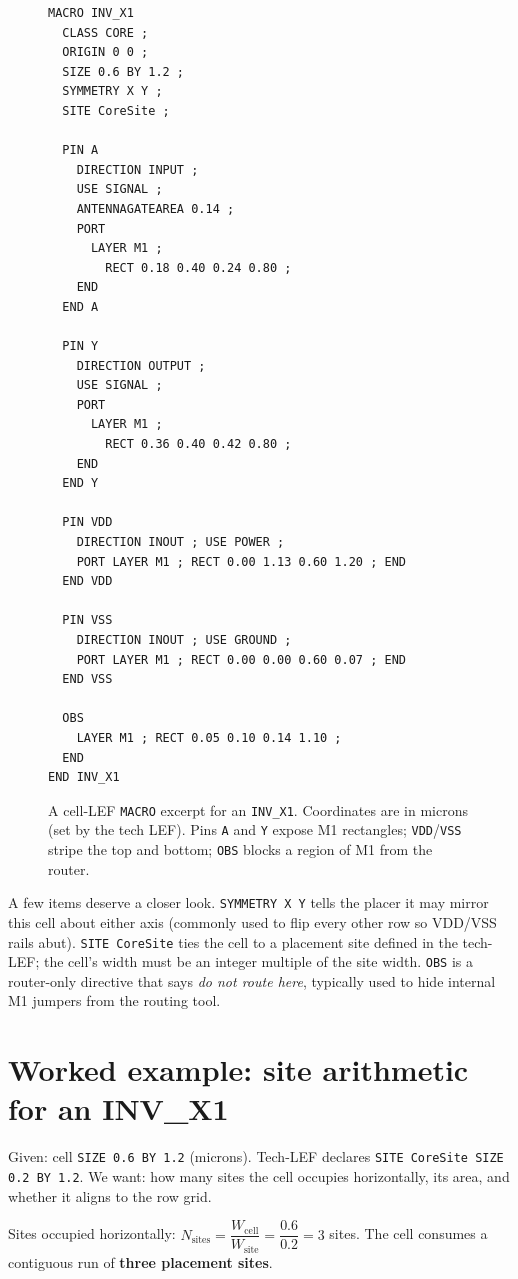 \begin{figure}[h]
\centering
\begin{lstlisting}[style=eda, basicstyle=\ttfamily\footnotesize, frame=single]
MACRO INV_X1
  CLASS CORE ;
  ORIGIN 0 0 ;
  SIZE 0.6 BY 1.2 ;
  SYMMETRY X Y ;
  SITE CoreSite ;

  PIN A
    DIRECTION INPUT ;
    USE SIGNAL ;
    ANTENNAGATEAREA 0.14 ;
    PORT
      LAYER M1 ;
        RECT 0.18 0.40 0.24 0.80 ;
    END
  END A

  PIN Y
    DIRECTION OUTPUT ;
    USE SIGNAL ;
    PORT
      LAYER M1 ;
        RECT 0.36 0.40 0.42 0.80 ;
    END
  END Y

  PIN VDD
    DIRECTION INOUT ; USE POWER ;
    PORT LAYER M1 ; RECT 0.00 1.13 0.60 1.20 ; END
  END VDD

  PIN VSS
    DIRECTION INOUT ; USE GROUND ;
    PORT LAYER M1 ; RECT 0.00 0.00 0.60 0.07 ; END
  END VSS

  OBS
    LAYER M1 ; RECT 0.05 0.10 0.14 1.10 ;
  END
END INV_X1
\end{lstlisting}
\caption{A cell-LEF \texttt{MACRO} excerpt for an \texttt{INV\_X1}. Coordinates are in microns (set by the tech LEF). Pins \texttt{A} and \texttt{Y} expose M1 rectangles; \texttt{VDD}/\texttt{VSS} stripe the top and bottom; \texttt{OBS} blocks a region of M1 from the router.}
\label{fig:lef-listing}
\end{figure}

A few items deserve a closer look. \texttt{SYMMETRY X Y} tells the placer it may mirror this cell about either axis (commonly used to flip every other row so VDD/VSS rails abut). \texttt{SITE CoreSite} ties the cell to a placement site defined in the tech-LEF; the cell's width must be an integer multiple of the site width. \texttt{OBS} is a router-only directive that says \emph{do not route here}, typically used to hide internal M1 jumpers from the routing tool.

\section{Worked example: site arithmetic for an INV\_X1}

Given: cell \texttt{SIZE 0.6 BY 1.2} (microns). Tech-LEF declares \texttt{SITE CoreSite SIZE 0.2 BY 1.2}. We want: how many sites the cell occupies horizontally, its area, and whether it aligns to the row grid.


Sites occupied horizontally: $N_{\text{sites}} = \dfrac{W_{\text{cell}}}{W_{\text{site}}} = \dfrac{0.6}{0.2} = 3$ sites. The cell consumes a contiguous run of \textbf{three placement sites}.


